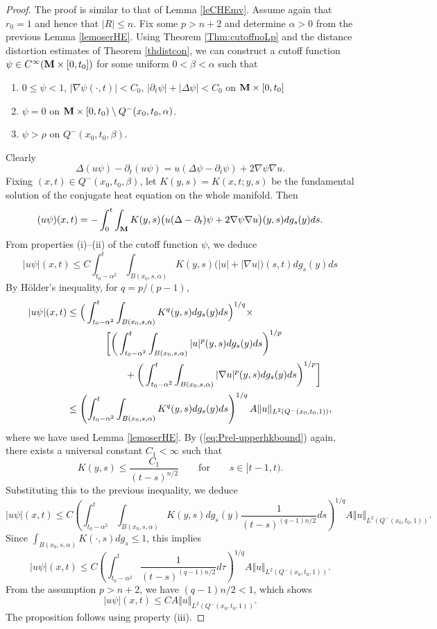 \documentclass[11pt]{amsart}
\numberwithin{equation}{section}
\def\al{\aligned}
\def\eal{\endaligned}
\def\a{\alpha}
\def\M{{\bf M}}
\def\al{\aligned}
\def\p{\partial}
\def\d{\nabla}
\numberwithin{equation}{section}
\begin{document}
\begin{proof}
The proof is similar to that of Lemma \ref{leCHEmv}.
Assume again that $r_0 = 1$ and hence that $| R | \leq n$.
Fix some $p > n+2$ and determine $\alpha > 0$ from the previous Lemma \ref{lemoserHE}.
Using Theorem \ref{Thm:cutoffnoLp} and the distance distortion estimates of Theorem \ref{thdistcon}, we can construct a cutoff function $\psi \in C^\infty ( \M \times [0, t_0])$ for some uniform $0 < \beta < \alpha$ such that
\begin{enumerate}[label=(\roman*)]
\item $0 \leq \psi < 1$, $|\nabla \psi(\cdot, t) | < C_0$, $|\partial_t \psi | + |\Delta \psi | < C_0$ on $\M \times [0, t_0]$
\item $\psi = 0$ on $\M \times [0, t_0) \setminus Q^- (x_0, t_0, \alpha )$.
\item $\psi > \rho$ on $Q^- (x_0, t_0, \beta)$.
\end{enumerate}
Clearly
\[ \Delta (u \psi) - \p_t (u \psi)= u( \Delta \psi - \partial_t \psi) + 2 \d \psi \d u. \] 
Fixing $(x, t) \in Q^- (x_0, t_0, \beta )$, let $K (y, s) = K(x, t; y, s)$ be the fundamental solution of the conjugate heat equation on the whole manifold.  
Then
\[
(u \psi) (x, t) = - \int_{0}^{t} \int_{\M} K(y, s) \big( u  (\Delta  - \partial_t ) \psi  +
2 \d \psi \d u \big) (y, s) dg_s (y) ds.
\]  
From properties (i)--(ii) of the cutoff function $\psi$,  we deduce
\[ |u \psi | (x, t) \le C   \int^t_{t_0-\a^2} \int_{B(x_0, s, \a)} K( y, s) \big( |u| + |\nabla u| \big) (s,t) dg_s(y) ds
\]
By H\"older's inequality, for
$q = p/(p-1)$,
\[
\al
|u \psi | (x,t) &\le  \Big(\int^t_{t_0-\a^2} \int_{B(x_0, s, \a)} K^q(y, s) dg_s (y) ds \Big)^{1/q} \times \\
&\qquad\qquad \bigg[ \bigg(\int^t_{t_0-\a^2 } \int_{B(x_0, s, \a)} |u|^p(y,s) dg_s (y) ds \bigg)^{1/p} \\
&\qquad\qquad\qquad + \bigg(\int^t_{t_0-\a^2 } \int_{B(x_0, s, \a)} |\nabla u|^p(y,s) dg_s (y) ds \bigg)^{1/p}  \bigg] \\
&\le \left(\int^t_{t_0-\a^2} \int_{B(x_0, s, \a)} K^q(y, s) dg_s (y) ds \right)^{1/q}  A \Vert u \Vert_{L^2(Q^-(x_0, t_0, 1))},
\eal
\]
where we have used Lemma \ref{lemoserHE}. 
By (\ref{eq:Prel-upperhkbound}) again, there exists a universal constant $C_1 < \infty$ such that
\[ K(y, s) \le \frac{C_1}{(t-s)^{n/2}} \qquad \text{for} \qquad s \in [t-1, t). \]
Substituting this to the previous inequality, we deduce
\[ |u \psi|(x,t) \le C \left(\int^t_{t_0-\a^2} \int_{B(x_0, s, \a)} K( y, s) dg_s (y) \frac{1}{(t-s)^{(q-1) n/2}} ds \right)^{1/q}  A \Vert u \Vert_{L^2(Q^-(x_0, t_0, 1))}. \] 
Since $\int_{B(x_0, s, \a)} K( \cdot , s) dg_s  \le 1$, this implies
\[ |u \psi| (x,t) \le C \left(\int^t_{t_0-\a^2} \frac{1}{(t-s)^{(q-1) n/2}} d\tau \right)^{1/q}  A \Vert u \Vert_{L^2(Q^-(x_0, t_0, 1))}. \]
From the assumption $p>n+2$,  we have $(q-1) n/2<1$, which shows
\[ |u \psi | (x,t) \le C A \Vert u \Vert_{L^2(Q^-(x_0, t_0, 1))}. \]
The proposition follows using property (iii).
\end{proof}
\end{document}
